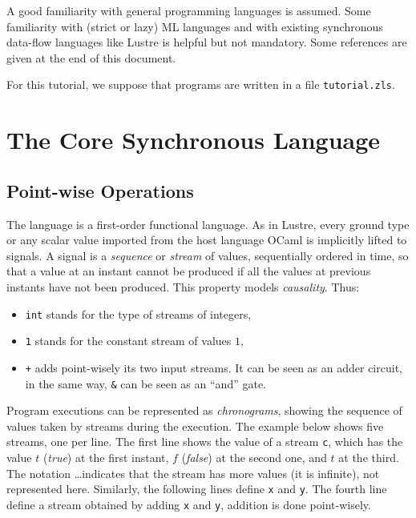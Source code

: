 \documentclass[11pt,titlepage,twoside]{report}
\newcommand{\zelus}{{\sf Z\'elus}}
\newcommand{\lustre}{{\sf Lustre}}
\newcommand{\ocaml}{{\sf OCaml}}
\begin{document}
A good familiarity with general programming
languages is assumed. Some familiarity with (strict or lazy) ML
languages and with existing synchronous data-flow languages like \lustre{} is
helpful but not mandatory. Some references are given at the end of this document.

For this tutorial, we suppose that programs are written in a file
\verb-tutorial.zls-.%

\section{The Core Synchronous Language}

\subsection{Point-wise Operations}
The language is a first-order functional language. As in \lustre,
every ground type or any scalar value imported from the host language
\ocaml{} is implicitly lifted to signals. A signal is a
\emph{sequence} or \emph{stream} of values, sequentially ordered in
time, so that a value at an instant cannot be produced if all the
values at previous instants have not been produced. This property
models \emph{causality}. Thus:
\begin{itemize}
\item \verb-int- stands for the type of streams of integers,
\item \verb-1- stands for the  constant stream of values $1$,
\item \verb-+- adds point-wisely its two input streams. It can be seen
  as an adder circuit, in the same way, \verb-&- can be seen as an
  ``and'' gate. \\
\end{itemize}
Program executions can be represented as {\em chronograms}, showing
the sequence of values taken by streams during the execution. The
example below shows five streams, one per line. The first line shows
the value of a stream {\tt c}, which has the value $t$ ({\em true}) at the
first instant, $f$ ({\em false}) at the second one, and $t$ at the
third. The notation \dots indicates that the stream has more values
(it is infinite), not represented here. Similarly, the following lines
define {\tt x} and {\tt y}. The fourth line define a stream obtained
by adding {\tt x} and {\tt y}, addition is done point-wisely.
\end{document}
